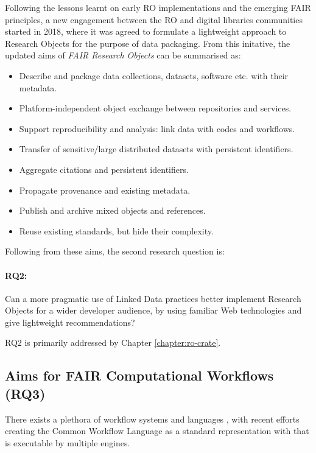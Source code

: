 Following the lessons learnt on early \acrfull{RO} implementations and the emerging \acrshort{FAIR} principles, a new engagement between the RO and digital libraries communities started in 2018, where it was agreed to formulate a lightweight approach to Research Objects \cite{Sefton 2018,Ó Carragáin 2019b} for the purpose of data packaging. From this initative, the updated aims of \emph{FAIR Research Objects} can be summarised as:
 
\begin{itemize}
    \item Describe and package data collections, datasets, software etc. with their metadata.
    \item Platform-independent object exchange between repositories and services.
    \item Support reproducibility and analysis: link data with codes and workflows.
    \item Transfer of sensitive/large distributed datasets with persistent identifiers.
    \item Aggregate citations and persistent identifiers.
    \item Propagate provenance and existing metadata.
    \item Publish and archive mixed objects and references.
    \item Reuse existing standards, but hide their complexity.
\end{itemize}

Following from these aims, the second research question is: 

\paragraph{RQ2:}\label{rq2}  Can a more pragmatic use of Linked Data practices better implement Research Objects for a wider developer audience, by using familiar Web technologies and give lightweight recommendations?

RQ2 is primarily addressed by Chapter \ref{chapter:ro-crate}.


\subsection{Aims for FAIR Computational Workflows (RQ3)}
\label{intro:rq3}

There exists a plethora of \gls{workflow} systems and languages \cite{Leipzig 2021,Amstutz 2021}, with recent efforts creating the Common Workflow Language \cite{Crusoe 2022} as a standard representation with  that is executable by multiple engines. 

